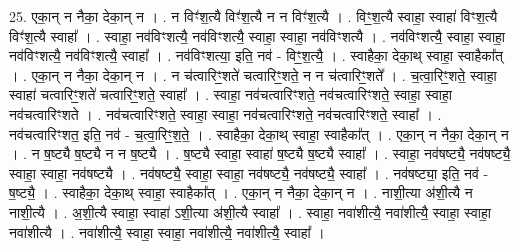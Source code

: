 \documentclass[17pt]{extarticle}
\begin{document}
25. एका॒न् न नैका॒ देका॒न् न । . न विꣳ॑श॒त्यै विꣳ॑श॒त्यै न न विꣳ॑श॒त्यै । . विꣳ॒॒श॒त्यै स्वाहा॒ स्वाहा॑ विꣳश॒त्यै विꣳ॑श॒त्यै स्वाहा᳚ । . स्वाहा॒ नव॑विꣳशत्यै॒ नव॑विꣳशत्यै॒ स्वाहा॒ स्वाहा॒ नव॑विꣳशत्यै । . नव॑विꣳशत्यै॒ स्वाहा॒ स्वाहा॒ नव॑विꣳशत्यै॒ नव॑विꣳशत्यै॒ स्वाहा᳚ । . नव॑विꣳशत्या॒ इति॒ नव॑ - विꣳ॒॒श॒त्यै॒ । . स्वाहैका॒ देका॒थ् स्वाहा॒ स्वाहैका᳚त् । . एका॒न् न नैका॒ देका॒न् न । . न च॑त्वारिꣳ॒॒शते॑ चत्वारिꣳ॒॒शते॒ न न च॑त्वारिꣳ॒॒शते᳚ । . च॒त्वा॒रिꣳ॒॒शते॒ स्वाहा॒ स्वाहा॑ चत्वारिꣳ॒॒शते॑ चत्वारिꣳ॒॒शते॒ स्वाहा᳚ । . स्वाहा॒ नव॑चत्वारिꣳशते॒ नव॑चत्वारिꣳशते॒ स्वाहा॒ स्वाहा॒ नव॑चत्वारिꣳशते । . नव॑चत्वारिꣳशते॒ स्वाहा॒ स्वाहा॒ नव॑चत्वारिꣳशते॒ नव॑चत्वारिꣳशते॒ स्वाहा᳚ । . नव॑चत्वारिꣳशत॒ इति॒ नव॑ - च॒त्वा॒रिꣳ॒॒श॒ते॒ । . स्वाहैका॒ देका॒थ् स्वाहा॒ स्वाहैका᳚त् । . एका॒न् न नैका॒ देका॒न् न । . न ष॒ष्ट्यै ष॒ष्ट्यै न न ष॒ष्ट्यै । . ष॒ष्ट्यै स्वाहा॒ स्वाहा॑ ष॒ष्ट्यै ष॒ष्ट्यै स्वाहा᳚ । . स्वाहा॒ नव॑षष्ट्यै॒ नव॑षष्ट्यै॒ स्वाहा॒ स्वाहा॒ नव॑षष्ट्यै । . नव॑षष्ट्यै॒ स्वाहा॒ स्वाहा॒ नव॑षष्ट्यै॒ नव॑षष्ट्यै॒ स्वाहा᳚ । . नव॑षष्ट्या॒ इति॒ नव॑ - ष॒ष्ट्यै॒ । . स्वाहैका॒ देका॒थ् स्वाहा॒ स्वाहैका᳚त् । . एका॒न् न नैका॒ देका॒न् न । . नाशी॒त्या अ॑शी॒त्यै न नाशी॒त्यै । . अ॒शी॒त्यै स्वाहा॒ स्वाहा॑ ऽशी॒त्या अ॑शी॒त्यै स्वाहा᳚ । . स्वाहा॒ नवा॑शीत्यै॒ नवा॑शीत्यै॒ स्वाहा॒ स्वाहा॒ नवा॑शीत्यै । . नवा॑शीत्यै॒ स्वाहा॒ स्वाहा॒ नवा॑शीत्यै॒ नवा॑शीत्यै॒ स्वाहा᳚ । \newline
\end{document}

